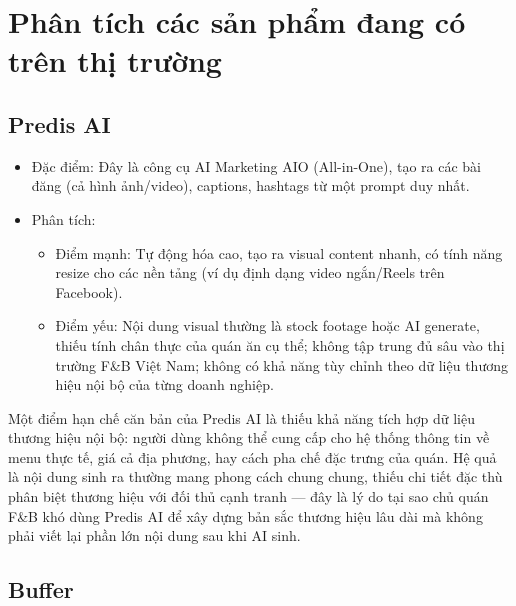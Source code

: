 \section{Phân tích các sản phẩm đang có trên thị
trường}\label{sec:phan-tich-san-pham}

\subsection{Predis AI}\label{subsec:predis}

\begin{itemize}
\item
  Đặc điểm: Đây là công cụ AI Marketing AIO (All-in-One), tạo ra các
  bài đăng (cả hình ảnh/video), captions, hashtags từ một prompt duy
  nhất.
\item
  Phân tích:

  \begin{itemize}
  \item
    Điểm mạnh: Tự động hóa cao, tạo ra visual content nhanh, có tính
    năng resize cho các nền tảng (ví dụ định dạng video ngắn/Reels trên
    Facebook).
  \item
    Điểm yếu: Nội dung visual thường là stock footage hoặc AI generate,
    thiếu tính chân thực của quán ăn cụ thể; không tập trung đủ sâu vào
    thị trường F\&B Việt Nam; không có khả năng tùy chỉnh theo dữ liệu
    thương hiệu nội bộ của từng doanh nghiệp.
  \end{itemize}
\end{itemize}

Một điểm hạn chế căn bản của Predis AI là thiếu khả năng tích hợp dữ
liệu thương hiệu nội bộ: người dùng không thể cung cấp cho hệ thống
thông tin về menu thực tế, giá cả địa phương, hay cách pha chế đặc
trưng của quán. Hệ quả là nội dung sinh ra thường mang phong cách chung
chung, thiếu chi tiết đặc thù phân biệt thương hiệu với đối thủ cạnh
tranh --- đây là lý do tại sao chủ quán F\&B khó dùng Predis AI để xây
dựng bản sắc thương hiệu lâu dài mà không phải viết lại phần lớn nội
dung sau khi AI sinh.

\subsection{Buffer}\label{subsec:buffer}

